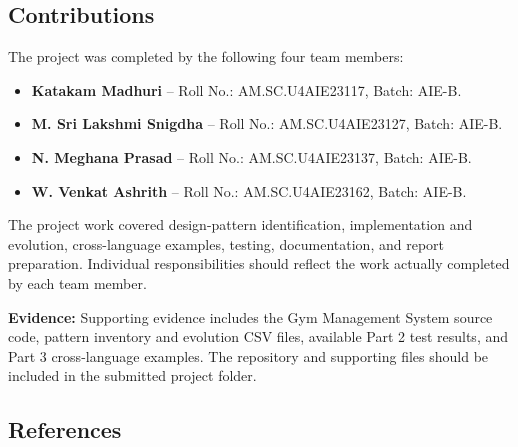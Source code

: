 \documentclass[11pt,a4paper]{article}
\begin{document}
\subsection*{Contributions}

The project was completed by the following four team members:

\begin{itemize}
    \item \textbf{Katakam Madhuri}
    -- Roll No.: AM.SC.U4AIE23117, Batch: AIE-B.

    \item \textbf{M. Sri Lakshmi Snigdha}
    -- Roll No.: AM.SC.U4AIE23127, Batch: AIE-B.

    \item \textbf{N. Meghana Prasad}
    -- Roll No.: AM.SC.U4AIE23137, Batch: AIE-B.

    \item \textbf{W. Venkat Ashrith}
    -- Roll No.: AM.SC.U4AIE23162, Batch: AIE-B.
\end{itemize}

The project work covered design-pattern identification,
implementation and evolution, cross-language examples,
testing, documentation, and report preparation. Individual
responsibilities should reflect the work actually completed
by each team member.

\textbf{Evidence:}
Supporting evidence includes the Gym Management System source
code, pattern inventory and evolution CSV files, available
Part 2 test results, and Part 3 cross-language examples.
The repository and supporting files should be included in
the submitted project folder.

\subsection*{References}
\end{document}
